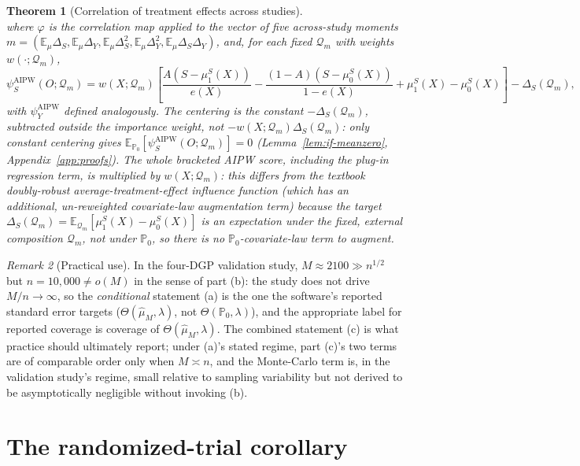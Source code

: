 \documentclass[11pt]{article}
\theoremstyle{plain}
\newtheorem{theorem}{Theorem}[section]
\theoremstyle{definition}
\theoremstyle{remark}
\newtheorem{remark}[theorem]{Remark}
\newcommand{\E}{\mathbb{E}}
\newcommand{\PP}{\mathbb{P}}
\newcommand{\Q}{\mathcal{Q}}
\newcommand{\Qhat}{\widehat{\mu}_M}
\begin{document}
\begin{theorem}[Correlation of treatment effects across studies]
\begin{equation}
\end{equation}
where $\varphi$ is the correlation map applied to the vector of five across-study
moments $m=(\E_\mu\Delta_S,\E_\mu\Delta_Y,\E_\mu\Delta_S^2,\E_\mu\Delta_Y^2,\E_\mu\Delta_S\Delta_Y)$,
and, for each fixed $\Q_m$ with weights $w(\cdot;\Q_m)$,
\begin{equation}\label{eq:psi-aipw}
    \psi_S^{\mathrm{AIPW}}(O;\Q_m) = w(X;\Q_m)\left[
        \frac{A(S-\mu_1^S(X))}{e(X)} - \frac{(1-A)(S-\mu_0^S(X))}{1-e(X)}
        + \mu_1^S(X)-\mu_0^S(X)
    \right] - \Delta_S(\Q_m),
\end{equation}
with $\psi_Y^{\mathrm{AIPW}}$ defined analogously. \emph{The centering is the constant
$-\Delta_S(\Q_m)$, subtracted outside the importance weight}, not
$-w(X;\Q_m)\Delta_S(\Q_m)$: only constant centering gives
$\E_{\PP_0}[\psi_S^{\mathrm{AIPW}}(O;\Q_m)]=0$ (Lemma~\ref{lem:if-meanzero},
Appendix~\ref{app:proofs}). The whole bracketed AIPW score, including the plug-in
regression term, is multiplied by $w(X;\Q_m)$: this differs from the textbook
doubly-robust average-treatment-effect influence function (which has an additional,
un-reweighted covariate-law augmentation term) because the target
$\Delta_S(\Q_m)=\E_{\Q_m}[\mu_1^S(X)-\mu_0^S(X)]$ is an expectation under the
\emph{fixed, external} composition $\Q_m$, not under $\PP_0$, so there is no
$\PP_0$-covariate-law term to augment.
\end{theorem}

\begin{remark}[Practical use]\label{rem:practical-use}
In the four-DGP validation study, $M\approx2100\gg n^{1/2}$ but $n=10{,}000\not=o(M)$
in the sense of part (b): the study does not drive $M/n\to\infty$, so the
\emph{conditional} statement (a) is the one the software's reported standard error
targets ($\Theta(\Qhat,\lambda)$, not $\Theta(\PP_0,\lambda)$), and the appropriate
label for reported coverage is coverage of $\Theta(\Qhat,\lambda)$. The combined
statement (c) is what practice should ultimately report; under (a)'s stated regime,
part (c)'s two terms are of comparable order only when $M\asymp n$, and the
Monte-Carlo term is, in the validation study's regime, small relative to sampling
variability but not derived to be asymptotically negligible without invoking (b).
\end{remark}

\section{The randomized-trial corollary}\label{sec:rct}
\end{document}
